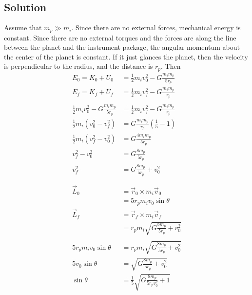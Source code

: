\documentclass[solutions]{esg8012pset}
\begin{document}
\subsection{Solution}
  Assume that $m_p \gg m_i$.  Since there are no external forces, mechanical energy is constant.  Since there are no external torques and the forces are along the line between the planet and the instrument package, the angular momentum about the center of the planet is constant.  If it just glances the planet, then the velocity is perpendicular to the radius, and the distance is $r_p$.  Then
  \begin{align*}
    E_0 = K_0 + U_0 & = \frac{1}{2}m_i v_0^2 - G\frac{m_i m_p}{5 r_p} \\
    E_f = K_f + U_f & = \frac{1}{2}m_i v_f^2 - G\frac{m_i m_p}{r_p} \\
    \\
    \frac{1}{2}m_i v_0^2 - G\frac{m_i m_p}{5 r_p} & = \frac{1}{2}m_i v_f^2 - G\frac{m_i m_p}{r_p} \\
    \frac{1}{2}m_i \left(v_0^2 - v_f^2\right) & = G \frac{m_i m_p}{r_p} \left(\frac{1}{5} - 1\right) \\
    \frac{1}{2}m_i \left(v_f^2 - v_0^2\right) & = G \frac{4 m_i m_p}{5 r_p} \\
    v_f^2 - v_0^2 & = G \frac{8 m_p}{5 r_p} \\
    v_f^2 & = G \frac{8 m_p}{5 r_p} + v_0^2 \\
    \\
    \\
    \vec L_0 & = \vec r_0 \times m_i \vec v_0 \\
    & = 5 r_p m_i v_0\sin\theta \\
    \vec L_f & = \vec r_f \times m_i \vec v_f \\
    & = r_p m_i \sqrt{G \frac{8 m_p}{5 r_p} + v_0^2} \\
    \\
    5 r_p m_i v_0\sin\theta & = r_p m_i \sqrt{G \frac{8 m_p}{5 r_p} + v_0^2} \\
    5 v_0\sin\theta & = \sqrt{G \frac{8 m_p}{5 r_p} + v_0^2} \\
    \sin\theta & = \frac{1}{5}\sqrt{G \frac{8 m_p}{5 r_p v_0^2} + 1}
  \end{align*}
\end{document}
